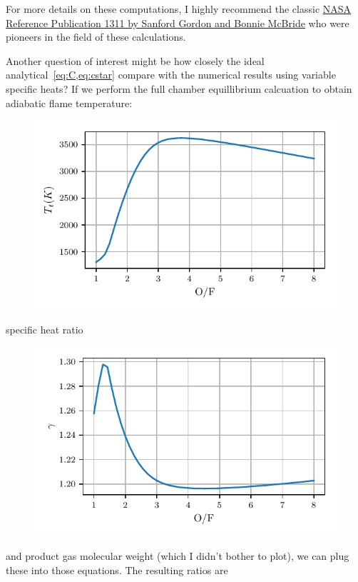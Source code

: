 \documentclass[twocolumn]{memoir} %
\begin{document}
For more details on these computations, I highly recommend the classic 
\href{https://www.grc.nasa.gov/www/CEAWeb/RP-1311.pdf}{NASA Reference Publication
1311 by Sanford Gordon and Bonnie McBride}\cite{gordon2} who were pioneers in the field of these calculations.

Another question of interest might be how closely the ideal analytical~\cref{eq:C,eq:cstar}
compare with the numerical results using variable specific heats?  If we perform the full
chamber equillibrium calcuation to obtain adiabatic flame temperature:
%
\begin{figure}[H]
    \includegraphics[width=\columnwidth]{Tt_ppp}
\end{figure}
%
specific heat ratio
%
\begin{figure}[H]
    \includegraphics[width=\columnwidth]{gamma_ppp}
\end{figure}
%
and product gas molecular weight (which I didn't bother to plot), we can plug these
into those equations.  The resulting ratios are
\end{document}
